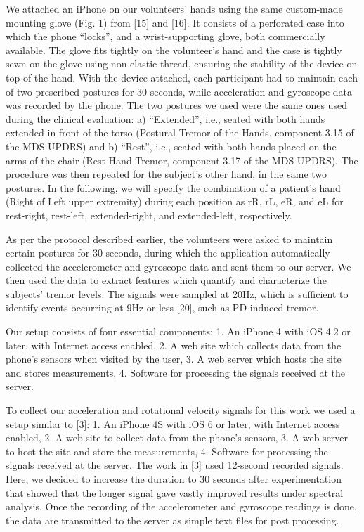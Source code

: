 We attached an iPhone on our volunteers’ hands using the same custom-made mounting glove (Fig. 1) from [15] and [16]. It consists of a perforated case into which the phone “locks”, and a wrist-supporting glove, both commercially available. The glove fits tightly on the volunteer’s hand and the case is tightly sewn on the glove using non-elastic thread, ensuring the stability of the device on top of the hand. With the device attached, each participant had to maintain each of two prescribed postures for 30 seconds, while acceleration and gyroscope data was recorded by the phone. The two postures we used were the same ones used during the clinical evaluation: a) “Extended”, i.e., seated with both hands extended in front of the torso (Postural Tremor of the Hands, component 3.15 of the MDS-UPDRS) and b) “Rest”, i.e., seated with both hands placed on the arms of the chair (Rest Hand Tremor, component 3.17 of the MDS-UPDRS). The procedure was then repeated for the subject’s other hand, in the same two postures. In the following, we will specify the combination of a patient’s hand (Right of Left upper extremity) during each position as rR, rL, eR, and eL for rest-right, rest-left, extended-right, and extended-left, respectively.

As per the protocol described earlier, the volunteers were asked to maintain certain postures for 30 seconds, during which the application automatically collected the accelerometer and gyroscope data and sent them to our server. We then used the data to extract features which quantify and characterize the subjects’ tremor levels. The signals were sampled at 20Hz, which is sufficient to identify events occurring at 9Hz or less [20], such as PD-induced tremor. 

Our setup consists of four essential components:
1. An iPhone 4 with iOS 4.2 or later, with Internet access enabled,
2. A web site which collects data from the phone’s sensors when visited by the user,
3. A web server which  hosts the site and stores measurements,
4. Software for processing the signals received at the server.



To collect our acceleration and rotational velocity signals for this work we used a setup similar to [3]:
1.	An iPhone 4S with iOS 6 or later, with Internet access enabled,
2.	A web site to collect data from the phone’s sensors,
3.	A web server to host the site and store the measurements,
4.	Software for processing the signals received at the server.
The work in [3] used 12-second recorded signals. Here, we decided to increase the duration to 30 seconds after experimentation that showed that the longer signal gave vastly improved results under spectral analysis. Once the recording of the accelerometer and gyroscope readings is done, the data are transmitted to the server as simple text files for post processing. 
 

